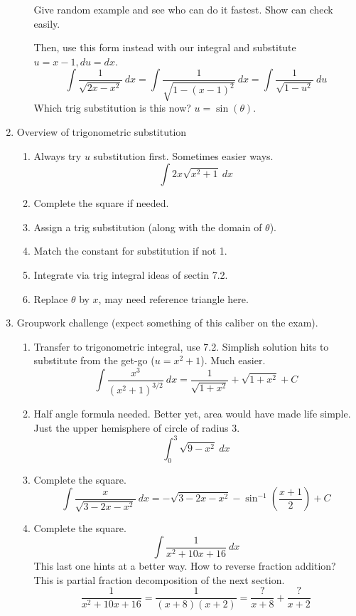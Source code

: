 \documentclass{article}
\begin{document}
\begin{enumerate}
\begin{enumerate}
Give random example and see who can do it fastest. Show can check easily.

Then, use this form instead with our integral and substitute $u=x-1, du = dx$.
\[
\int \frac{1}{\sqrt{2x-x^2}}~dx = \int \frac{1}{\sqrt{1-(x-1)^2}}~dx = \int \frac{1}{\sqrt{1-u^2}}~du
\]
Which trig substitution is this now? $u=\sin(\theta)$. 
\end{enumerate}

\item Overview of trigonometric substitution
\begin{enumerate}
\item Always try $u$ substitution first. Sometimes easier ways.
\[
\int 2x\sqrt{x^2+1}~dx
\]
\item Complete the square if needed.
\item Assign a trig substitution (along with the domain of $\theta$).
\item Match the constant for substitution if not 1.
\item Integrate via trig integral ideas of sectin 7.2.
\item Replace $\theta$ by $x$, may need reference triangle here.
\end{enumerate}


\item Groupwork challenge (expect something of this caliber on the exam).
\begin{enumerate}

\item Transfer to trigonometric integral, use 7.2. Simplish solution hits to substitute from the get-go ($u=x^2+1$). Much easier.
\[
\int\frac{x^3}{(x^2+1)^{3/2}}~dx = \frac{1}{\sqrt{1+x^2}}+\sqrt{1+x^2}+C
\]

\item Half angle formula needed. Better yet, area would have made life simple. Just the upper hemisphere of circle of radius 3.
\[
\int_0^3 \sqrt{9-x^2}~dx
\]

\item Complete the square.
\[
\int\frac{x}{\sqrt{3-2x-x^2}}~dx = -\sqrt{3-2x-x^2}-\sin^{-1}(\frac{x+1}{2})+C
\]

\item Complete the square.
\[
\int \frac{1}{x^2+10x+16}~dx
\]
This last one hints at a better way. How to reverse fraction addition? This is partial fraction decomposition of the next section.
\[
\frac{1}{x^2+10x+16} = \frac{1}{(x+8)(x+2)} = \frac{?}{x+8}+\frac{?}{x+2}
\]
\end{enumerate}
\end{enumerate}
\end{document}
